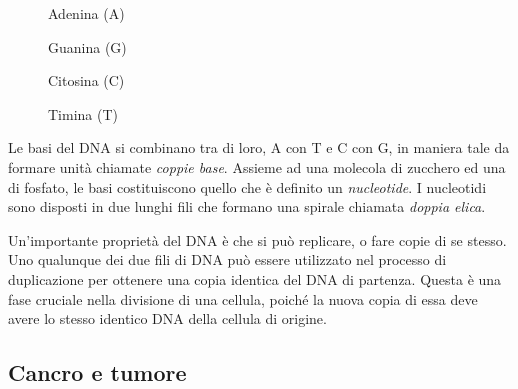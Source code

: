 \begin{figure}[!h]
    \begin{minipage}{0.5 \textwidth}
        \centering
        \adenina
        \caption{Adenina (A)}
        \label{fig:dna-adenina}
    \end{minipage}
    \begin{minipage}{0.5 \textwidth}
        \centering
        \guanina
        \caption{Guanina (G)}
        \label{fig:dna-guanina}
    \end{minipage}
\end{figure}
\begin{figure}[!h]
    \begin{minipage}{0.5 \textwidth}
        \centering
        \citosina
        \caption{Citosina (C)}
        \label{fig:dna-citosina}
    \end{minipage}
    \begin{minipage}{0.5 \textwidth}
        \centering
        \timina
        \caption{Timina (T)}
        \label{fig:dna-timina}
    \end{minipage}
\end{figure}

Le basi del DNA si combinano tra di loro, A con T e C con G, in maniera tale da formare unità chiamate \textit{coppie base}. Assieme ad una molecola di zucchero ed una di fosfato, le basi costituiscono quello che è definito un \textit{nucleotide}. I nucleotidi sono disposti in due lunghi fili che formano una spirale chiamata \textit{doppia elica}.

Un'importante proprietà del DNA è che si può replicare, o fare copie di se stesso. Uno qualunque dei due fili di DNA \cite{WhatisDN79:online} può essere utilizzato nel processo di duplicazione per ottenere una copia identica del DNA di partenza. Questa è una fase cruciale nella divisione di una cellula, poiché la nuova copia di essa deve avere lo stesso identico DNA della cellula di origine.

\subsection{Cancro e tumore}
\label{chap:intro-biology-cancer}

